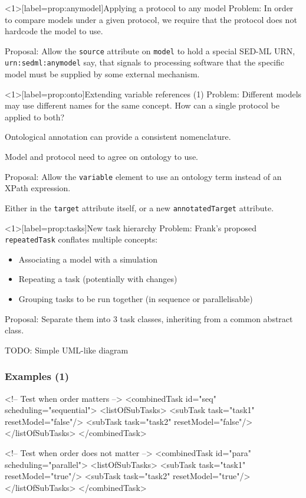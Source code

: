 \documentclass[t,xcolor={usenames,dvipsnames}]{beamer}
\newcommand{\sedml}[1]{\lstinline[basicstyle=\color{blue}]!#1!}
\begin{document}
\begin{frame}<1>[label=prop:anymodel]{Applying a protocol to any model}
\alert{Problem}:
 In order to compare models under a given protocol, we require that
 the protocol does not hardcode the model to use.

\alert{Proposal}:
 Allow the \sedml{source} attribute on \sedml{model} to hold a special
 SED-ML URN, \sedml{urn:sedml:anymodel} say, that signals to
 processing software that the specific model must be supplied by some
 external mechanism.
\end{frame}


\begin{frame}<1>[label=prop:onto]{Extending variable references (1)}
\alert{Problem}:
 Different models may use different names for the same concept.  How
 can a single protocol be applied to both?

 \alert{Ontological annotation} can provide a consistent nomenclature.

 Model and protocol need to agree on ontology to use.

\alert{Proposal}:
 Allow the \sedml{variable} element to use an ontology term instead of
 an XPath expression.

 Either in the \sedml{target} attribute itself, or a new
 \sedml{annotatedTarget} attribute.
\end{frame}


\begin{frame}<1>[label=prop:tasks]{New task hierarchy}
\alert{Problem}:
 Frank's proposed \sedml{repeatedTask} conflates multiple concepts:
\begin{itemize}
\item Associating a model with a simulation
\item Repeating a task (potentially with changes)
\item Grouping tasks to be run together (in sequence or parallelisable)
\end{itemize}

\alert{Proposal}:
 Separate them into 3 task classes, inheriting from a common abstract
 class.

TODO: Simple UML-like diagram
\end{frame}


\begin{frame}[fragile=singleslide]
\frametitle{Examples (1)}
\begin{blksedml}
<!-- Test when order matters -->
<combinedTask id="seq" scheduling="sequential">
    <listOfSubTasks>
        <subTask task="task1" resetModel="false"/>
        <subTask task="task2" resetModel="false"/>
    </listOfSubTasks>
</combinedTask>

<!-- Test when order does not matter -->
<combinedTask id="para" scheduling="parallel">
    <listOfSubTasks>
        <subTask task="task1" resetModel="true"/>
        <subTask task="task2" resetModel="true"/>
    </listOfSubTasks>
</combinedTask>
\end{blksedml}
\end{frame}
        
\end{document}
